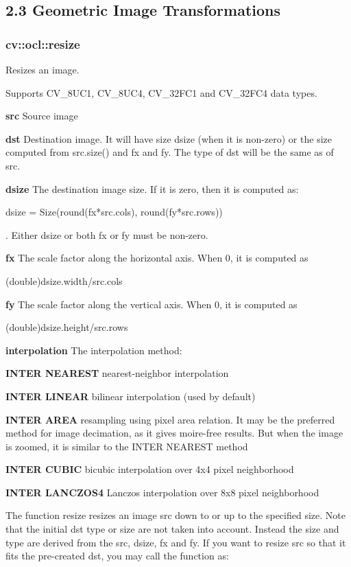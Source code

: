 \documentclass{article}
\begin{document}
\subsection{2.3 Geometric Image Transformations}
\label{subsec:mylabel5}
\subsubsection{cv::ocl::resize}
\label{subsubsec:mylabel45}
Resizes an image.

Supports CV{\_}8UC1, CV{\_}8UC4, CV{\_}32FC1 and CV{\_}32FC4 data types.

\textbf{src }Source image

\textbf{dst }Destination image. It will have size dsize (when it is
non-zero) or the size computed from src.size() and fx and fy. The type of
dst will be the same as of src.

\textbf{dsize }The destination image size. If it is zero, then it is
computed as:

dsize = Size(round(fx*src.cols), round(fy*src.rows))

. Either dsize or both fx or fy must be non-zero.

\textbf{fx }The scale factor along the horizontal axis. When 0, it is
computed as

(double)dsize.width/src.cols

\textbf{fy }The scale factor along the vertical axis. When 0, it is computed
as

(double)dsize.height/src.rows

\textbf{interpolation }The interpolation method:

\textbf{INTER NEAREST }nearest-neighbor interpolation

\textbf{INTER LINEAR }bilinear interpolation (used by default)

\textbf{INTER AREA }resampling using pixel area relation. It may be the
preferred method for image decimation, as it gives moire-free results. But
when the image is zoomed, it is similar to the INTER NEAREST method

\textbf{INTER CUBIC }bicubic interpolation over 4x4 pixel neighborhood

\textbf{INTER LANCZOS4 }Lanczos interpolation over 8x8 pixel neighborhood

The function resize resizes an image src down to or up to the specified
size. Note that the initial dst type or size are not taken into account.
Instead the size and type are derived from the src, dsize, fx and fy. If you
want to resize src so that it fits the pre-created dst, you may call the
function as:
\end{document}
